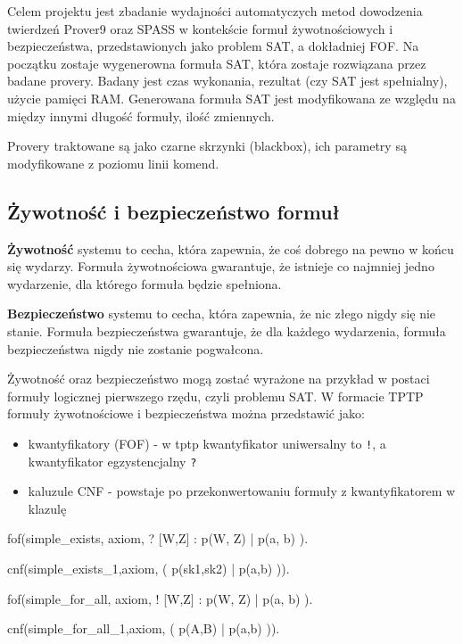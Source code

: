 \documentclass[a4paper,12pt]{article}
\begin{document}
Celem projektu jest zbadanie wydajności automatyczych metod dowodzenia twierdzeń Prover9 oraz SPASS w kontekście formuł żywotnościowych i bezpieczeństwa, przedstawionych jako problem \gls{SAT}, a dokładniej \gls{FOF}. Na początku zostaje wygenerowna formuła \gls{SAT}, która zostaje rozwiązana przez badane provery. Badany jest czas wykonania, rezultat (czy \gls{SAT} jest spełnialny), użycie pamięci RAM.  Generowana formuła \gls{SAT} jest modyfikowana ze względu na między innymi długość formuły, ilość zmiennych.

Provery traktowane są jako czarne skrzynki (blackbox), ich parametry są modyfikowane z poziomu linii komend.

\subsection{Żywotność i bezpieczeństwo formuł}

\textbf{Żywotność} systemu to cecha, która zapewnia, że coś dobrego na pewno w końcu się wydarzy. Formuła żywotnościowa gwarantuje, że istnieje co najmniej jedno wydarzenie, dla którego formuła będzie spełniona.

\textbf{Bezpieczeństwo} systemu to cecha, która zapewnia, że nic złego nigdy się nie stanie. Formuła bezpieczeństwa gwarantuje, że dla każdego wydarzenia, formuła bezpieczeństwa nigdy nie zostanie pogwałcona.

Żywotność oraz bezpieczeństwo mogą zostać wyrażone na przykład w postaci formuły logicznej pierwszego rzędu, czyli problemu SAT.
W formacie TPTP formuły żywotnościowe i bezpieczeństwa można przedstawić jako:
\begin{itemize}
  \item kwantyfikatory (\gls{FOF}) - w tptp kwantyfikator uniwersalny to \texttt{!}, a kwantyfikator egzystencjalny \texttt{?}
  \item kaluzule \gls{CNF} - powstaje po przekonwertowaniu formuły z kwantyfikatorem w klazulę
\end{itemize}

\begin{tptpcode}
fof(simple_exists, axiom,
 ? [W,Z] :  p(W, Z) | p(a, b)
  ).

cnf(simple_exists_1,axiom,
    ( p(sk1,sk2) | p(a,b) )).
\end{tptpcode}

\begin{tptpcode}
fof(simple_for_all, axiom,
 ! [W,Z] :  p(W, Z) | p(a, b)
  ).

cnf(simple_for_all_1,axiom,
    ( p(A,B) | p(a,b) )).
\end{tptpcode}
\end{document}
